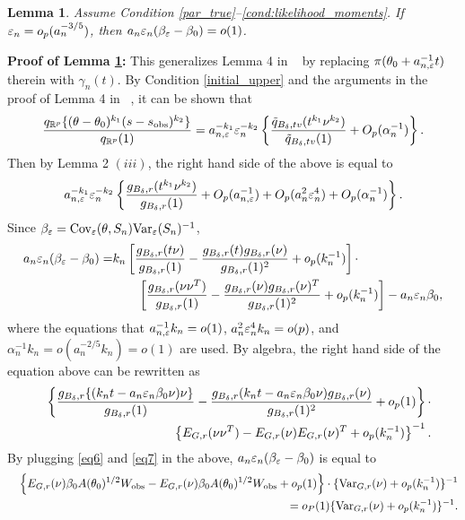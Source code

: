 \documentclass{article}
\newtheorem{lemma}{Lemma}
\begin{document}
\begin{lemma}\label{Alemma5} 
Assume Condition \ref{par_true}--\ref{cond:likelihood_moments}. If $\varepsilon_{n}=o_{p}(a_{n}^{-3/5})$, then $a_{n}\varepsilon_{n}(\beta_{\varepsilon}-\beta_{0})=o(1)$.
\end{lemma}
{\bf Proof of Lemma \ref{Alemma5}:} 
	This generalizes Lemma 4 in ~\cite{Li2017} by replacing $\pi(\theta_{0}+a_{n,\varepsilon}^{-1}t)$
	therein with $\gamma_{n}(t)$. By Condition \ref{initial_upper} and the arguments in the proof
	of Lemma 4 in ~\cite{Li2017}, it can be shown that 
	\[
	\frac{q_{\mathbb{R}^{p}}\{(\theta-\theta_{0})^{k_{1}}(s-s_{\rm obs})^{k_{2}}\}}{q_{\mathbb{R}^{p}}(1)}=a_{n,\varepsilon}^{-k_{1}}\varepsilon_{n}^{-k_{2}}\left\{ \frac{\tilde{q}_{B_{\delta},tv}(t^{k_{1}}\nu^{k_{2}})}{\tilde{q}_{B_{\delta},tv}(1)}+O_{p}(\alpha_{n}^{-1})\right\} .
	\]
	Then by Lemma 2 $(iii)$, the right hand side of the above is equal
	to 
	\[
	a_{n,\varepsilon}^{-k_{1}}\varepsilon_{n}^{-k_{2}}\left\{ \frac{g_{B_{\delta},r}(t^{k_{1}}\nu^{k_{2}})}{g_{B_{\delta},r}(1)}+O_{p}(a_{n,\varepsilon}^{-1})+O_{p}(a_{n}^{2}\varepsilon_{n}^{4})+O_{p}(\alpha_{n}^{-1})\right\} .
	\]
	Since $\beta_{\varepsilon}=\text{Cov}_{\varepsilon}(\theta,S_{n})\text{Var}_{\varepsilon}(S_{n})^{-1}$,
	\begin{align*}
	a_{n}\varepsilon_{n}(\beta_{\varepsilon}-\beta_{0})= & k_{n}\left[\frac{g_{B_{\delta},r}(t\nu)}{g_{B_{\delta},r}(1)}-\frac{g_{B_{\delta},r}(t)g_{B_{\delta},r}(\nu)}{g_{B_{\delta},r}(1)^{2}}+o_{p}(k_{n}^{-1})\right]\cdot\\
	& \qquad\left[\frac{g_{B_{\delta},r}(\nu\nu^{T})}{g_{B_{\delta},r}(1)}-\frac{g_{B_{\delta},r}(\nu)g_{B_{\delta},r}(\nu)^{T}}{g_{B_{\delta},r}(1)^{2}}+o_{p}(k_{n}^{-1})\right]-a_{n}\varepsilon_{n}\beta_{0},
	\end{align*}
	where the equations that $a_{n,\varepsilon}^{-1}k_{n}=o(1)$, $a_{n}^{2}\varepsilon_{n}^{4}k_{n}=o(p)$,
	and $\alpha_{n}^{-1}k_{n}=o(a_{n}^{-2/5}k_{n})=o(1)$ are used. By
	algebra, the right hand side of the equation above can be rewritten
	as 
	\begin{eqnarray*}
		&  & \left\{ \frac{g_{B_{\delta},r}\{(k_{n}t-a_{n}\varepsilon_{n}\beta_{0}\nu)\nu\}}{g_{B_{\delta},r}(1)}-\frac{g_{B_{\delta},r}(k_{n}t-a_{n}\varepsilon_{n}\beta_{0}\nu)g_{B_{\delta},r}(\nu)}{g_{B_{\delta},r}(1)^{2}}+o_{p}(1)\right\} \cdot\\
		&  & \qquad\left\{ E_{G,r}(\nu\nu^{T})-E_{G,r}(\nu)E_{G,r}(\nu)^{T}+o_{p}(k_{n}^{-1})\right\} ^{-1}.
	\end{eqnarray*}
	By plugging \eqref{eq6} and \eqref{eq7} in the above, $a_{n}\varepsilon_{n}(\beta_{\varepsilon}-\beta_{0})$
	is equal to 
	\begin{eqnarray*}
		&  & \left\{ E_{G,r}(\nu)\beta_{0}A(\theta_{0})^{1/2}W_{\rm obs}-E_{G,r}(\nu)\beta_{0}A(\theta_{0})^{1/2}W_{\rm obs}+o_{p}(1)\right\} \cdot%
		\{\text{Var}_{G,r}(\nu)+o_{p}(k_{n}^{-1})\}^{-1}\\
		&&\hspace{1cm} = o_{P}(1)\{\text{Var}_{G,r}(\nu)+o_{p}(k_{n}^{-1})\}^{-1}.
	\end{eqnarray*}
\end{document}
